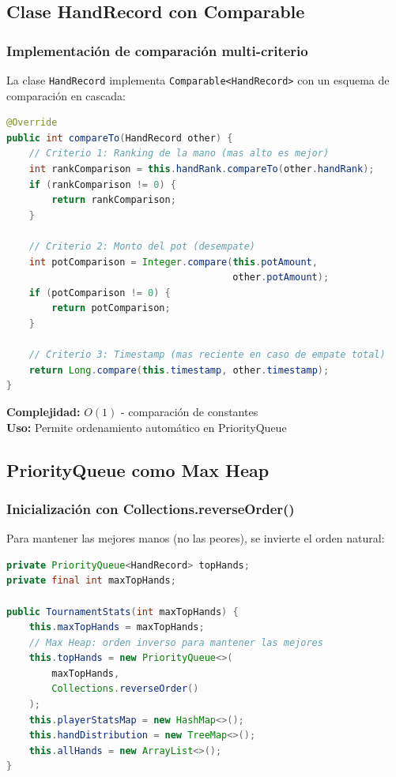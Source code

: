 \documentclass[12pt,a4paper]{article}
\begin{document}
\subsection{Clase HandRecord con Comparable}

\subsubsection{Implementación de comparación multi-criterio}

La clase \texttt{HandRecord} implementa \texttt{Comparable<HandRecord>} con un esquema de comparación en cascada:

\begin{lstlisting}[language=Java, caption=Comparación multi-criterio en HandRecord]
@Override
public int compareTo(HandRecord other) {
    // Criterio 1: Ranking de la mano (mas alto es mejor)
    int rankComparison = this.handRank.compareTo(other.handRank);
    if (rankComparison != 0) {
        return rankComparison;
    }
    
    // Criterio 2: Monto del pot (desempate)
    int potComparison = Integer.compare(this.potAmount, 
                                        other.potAmount);
    if (potComparison != 0) {
        return potComparison;
    }
    
    // Criterio 3: Timestamp (mas reciente en caso de empate total)
    return Long.compare(this.timestamp, other.timestamp);
}
\end{lstlisting}

\textbf{Complejidad:} $O(1)$ - comparación de constantes \\
\textbf{Uso:} Permite ordenamiento automático en PriorityQueue

\subsection{PriorityQueue como Max Heap}

\subsubsection{Inicialización con Collections.reverseOrder()}

Para mantener las mejores manos (no las peores), se invierte el orden natural:

\begin{lstlisting}[language=Java, caption=Inicialización de Max Heap]
private PriorityQueue<HandRecord> topHands;
private final int maxTopHands;

public TournamentStats(int maxTopHands) {
    this.maxTopHands = maxTopHands;
    // Max Heap: orden inverso para mantener las mejores
    this.topHands = new PriorityQueue<>(
        maxTopHands, 
        Collections.reverseOrder()
    );
    this.playerStatsMap = new HashMap<>();
    this.handDistribution = new TreeMap<>();
    this.allHands = new ArrayList<>();
}
\end{lstlisting}
\end{document}
